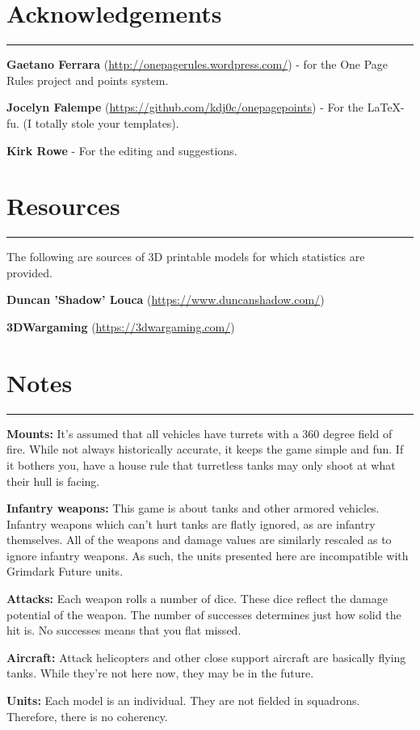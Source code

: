 \documentclass[11pt]{article}
\newcommand{\mysection}[1]{
  \section*{\centering #1}
  \raggedright
  \hrule
  \bigskip

}
\renewenvironment{description}
  {\list{}{\labelwidth=0pt \leftmargin=0pt
   \let\makelabel\descriptionlabel}}
  {\endlist}
\begin{document}
\begin{multicols*}{2}[]
\raggedcolumns

\mysection{Acknowledgements}

\begin{description}
\item {\bf Gaetano Ferrara}
  ({\footnotesize\url{http://onepagerules.wordpress.com/}}) - for
  the One Page Rules project and points system.
\item {\bf Jocelyn Falempe}
  ({\footnotesize\url{https://github.com/kdj0c/onepagepoints}}) -
For the \LaTeX-fu. (I totally stole your templates).
\item {\bf Kirk Rowe} - For the editing and suggestions.
\end{description}

\mysection{Resources}

The following are sources of 3D printable models for which statistics
are provided.

\begin{description}
\item {\bf Duncan 'Shadow' Louca}
  ({\footnotesize\url{https://www.duncanshadow.com/}})
\item {\bf 3DWargaming} ({\footnotesize\url{https://3dwargaming.com/}})
\end{description}

\mysection{Notes}

\begin{description}
\item{\bf Mounts:} It’s assumed that all vehicles have turrets with a 360
  degree field of fire. While not always historically accurate, it
  keeps the game simple and fun. If it bothers you, have a house rule
  that turretless tanks may only shoot at what their hull is facing.
\item{\bf Infantry weapons:} This game is about tanks and other armored
  vehicles. Infantry weapons which can’t hurt tanks are flatly
  ignored, as are infantry themselves. All of the weapons and damage
  values are similarly rescaled as to ignore infantry weapons. As
  such, the units presented here are incompatible with Grimdark Future
  units.
\item{\bf Attacks:} Each weapon rolls a number of dice. These dice reflect
  the damage potential of the weapon. The number of successes
  determines just how solid the hit is. No successes means that you
  flat missed.
\item{\bf Aircraft:} Attack helicopters and other close support aircraft
  are basically flying tanks. While they’re not here now, they may be
  in the future.
\item{\bf Units:} Each model is an individual. They are not fielded in
  squadrons. Therefore, there is no coherency.


\end{description}
\end{multicols*}
\end{document}
